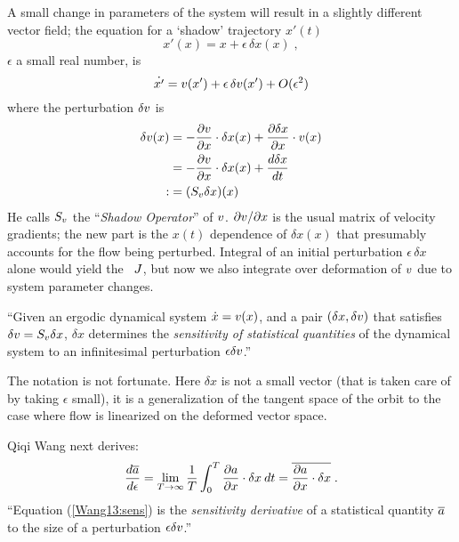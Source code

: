 \begin{description}
A small change in parameters of the system will result in a slightly
different vector field; the equation for a `shadow' trajectory $x'(t)$
\begin{equation} \label{Wang13:wrap0}
x'(x) = x + \epsilon\, \delta x(x) \;,
\end{equation}
$\epsilon$ a small real number,
is
\begin{equation}\label{Wang13:dfode}
\dot{x'} = v(x') + \epsilon\, \delta v(x') + O(\epsilon^2)
\end{equation}
where the perturbation $\delta v$ is
\begin{equation}\label{Wang13:Sf}
\begin{split}
\delta v(x) &= -\frac{\partial v}{\partial x} \cdot \delta x(x)
             + \frac{\partial \delta x}{\partial x} \cdot v(x)  \\
            &= -\frac{\partial v}{\partial x} \cdot \delta x(x)
             + \frac{d \delta x}{dt}\\
           :&= (S_{v} \delta x)(x)
\end{split}
\end{equation}
He calls $S_{v}$ the ``{\em Shadow Operator}'' of $v$. ${\partial
v}/{\partial x}$ is the usual matrix of velocity gradients; the
new part is the $x(t)$ dependence of $\delta x(x)$ that presumably
accounts for the flow being perturbed. Integral of an initial
perturbation $\epsilon\,\delta x$ alone would yield the \JacobianM\
$J$, but now we also integrate over deformation of $v$ due to
system parameter changes.

``Given an ergodic dynamical system $\dot{x} = v(x)$, and a pair
$(\delta x, \delta v)$ that satisfies $\delta v =
S_{v} \delta x$, $\delta x$ determines the {\em sensitivity of
statistical quantities} of the dynamical system to an infinitesimal
perturbation $\epsilon\delta v$.''

The notation is not fortunate. Here $\delta x$ is not a small vector
(that is taken care of by taking $\epsilon$ small), it is a
generalization of the tangent space of the orbit to the case where
flow is linearized on the deformed vector space.

Qiqi Wang next derives:
\begin{equation} \label{Wang13:sens}
\frac{d \overline{a}}{d\epsilon}
= \lim_{T\rightarrow\infty}
\frac1T \int_0^T \frac{\partial a}{\partial x} \cdot \delta x\:dt
= \overline{
\frac{\partial a}{\partial x} \cdot \delta x } \;.
\end{equation}
``Equation (\ref{Wang13:sens}) is the \emph{sensitivity derivative} of
a statistical quantity $\overline{a}$ to the size of a
perturbation $\epsilon\delta v$.''


\end{description}
